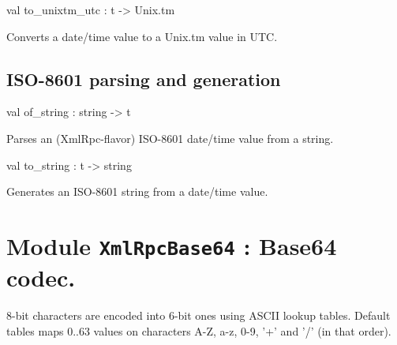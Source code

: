 \documentclass[11pt]{article}
\begin{document}
\label{val:XmlRpcDateTime.to-underscoreunixtm-underscoreutc}\begin{ocamldoccode}
val to_unixtm_utc : t -> Unix.tm
\end{ocamldoccode}
\begin{ocamldocdescription}
Converts a date/time value to a Unix.tm value in UTC.


\end{ocamldocdescription}




\subsection{ISO-8601 parsing and generation}




\label{val:XmlRpcDateTime.of-underscorestring}\begin{ocamldoccode}
val of_string : string -> t
\end{ocamldoccode}
\begin{ocamldocdescription}
Parses an (XmlRpc-flavor) ISO-8601 date/time value from a string.


\end{ocamldocdescription}




\label{val:XmlRpcDateTime.to-underscorestring}\begin{ocamldoccode}
val to_string : t -> string
\end{ocamldoccode}
\begin{ocamldocdescription}
Generates an ISO-8601 string from a date/time value.


\end{ocamldocdescription}


\section{Module {\tt{XmlRpcBase64}} : Base64 codec.}
\label{module:XmlRpcBase64}



	8-bit characters are encoded into 6-bit ones using ASCII lookup tables.
	Default tables maps 0..63 values on characters A-Z, a-z, 0-9, '+' and '/'
	(in that order).



\ocamldocvspace{0.5cm}
\end{document}
